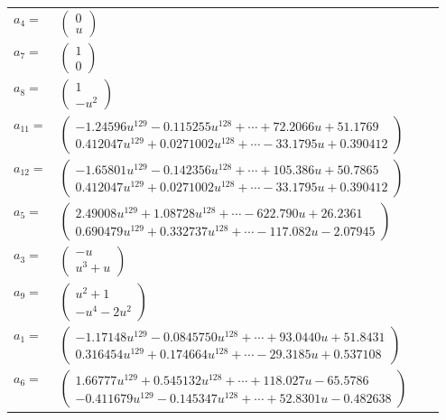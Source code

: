 \documentclass[1p]{elsarticle_modified}
\theoremstyle{definition}
\begin{document}
\begin{tabular}{m{7pt} m{180pt} m{7pt} m{180pt} }
\flushright $a_{4}=$&$\begin{pmatrix}0\\u\end{pmatrix}$ \\
\flushright $a_{7}=$&$\begin{pmatrix}1\\0\end{pmatrix}$ \\
\flushright $a_{8}=$&$\begin{pmatrix}1\\- u^2\end{pmatrix}$ \\
\flushright $a_{11}=$&$\begin{pmatrix}-1.24596 u^{129}-0.115255 u^{128}+\cdots+72.2066 u+51.1769\\0.412047 u^{129}+0.0271002 u^{128}+\cdots-33.1795 u+0.390412\end{pmatrix}$ \\
\flushright $a_{12}=$&$\begin{pmatrix}-1.65801 u^{129}-0.142356 u^{128}+\cdots+105.386 u+50.7865\\0.412047 u^{129}+0.0271002 u^{128}+\cdots-33.1795 u+0.390412\end{pmatrix}$ \\
\flushright $a_{5}=$&$\begin{pmatrix}2.49008 u^{129}+1.08728 u^{128}+\cdots-622.790 u+26.2361\\0.690479 u^{129}+0.332737 u^{128}+\cdots-117.082 u-2.07945\end{pmatrix}$ \\
\flushright $a_{3}=$&$\begin{pmatrix}- u\\u^3+u\end{pmatrix}$ \\
\flushright $a_{9}=$&$\begin{pmatrix}u^2+1\\- u^4-2 u^2\end{pmatrix}$ \\
\flushright $a_{1}=$&$\begin{pmatrix}-1.17148 u^{129}-0.0845750 u^{128}+\cdots+93.0440 u+51.8431\\0.316454 u^{129}+0.174664 u^{128}+\cdots-29.3185 u+0.537108\end{pmatrix}$ \\
\flushright $a_{6}=$&$\begin{pmatrix}1.66777 u^{129}+0.545132 u^{128}+\cdots+118.027 u-65.5786\\-0.411679 u^{129}-0.145347 u^{128}+\cdots+52.8301 u-0.482638\end{pmatrix}$ \\

\end{tabular}
\end{document}
